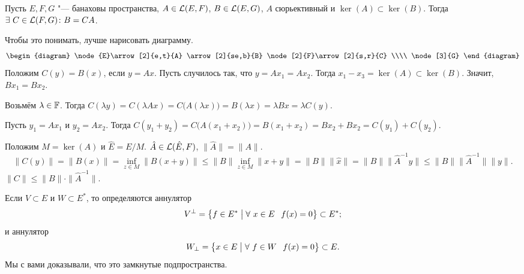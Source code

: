 \begin{The}[о тройке]\label{otroike}
  Пусть $E,F,G$ "--- банаховы пространства, $A\in\mathcal L(E,F)$, $B\in \mathcal L(E,G)$, $A$ сюрьективный и $\ker (A)\subset \ker(B)$. Тогда $\exists\ C\in\mathcal L(F,G)\colon B = CA$.
\end{The}
\begin{Proof}
  Чтобы это понимать, лучше нарисовать диаграмму.
\[
\begin{diagram}
  \node{E}\arrow[2]{e,t}{A}
  	  \arrow[2]{se,b}{B}
  \node[2]{F}\arrow[2]{s,r}{C} \\\\
  \node[3]{G}
\end{diagram}
\]
Положим $C(y) = B(x)$, если $y= Ax$. Пусть случилось так, что $y = Ax_1= A x_2$. Тогда $x_1-x_3 = \ker(A)\subset \ker(B)$. Значит, $B x_1 = B x_2$.

Возьмём $\lambda\in \mathbb F$. Тогда $C(\lambda y) = C(\lambda Ax) = C\big(A(\lambda x)\big) = B(\lambda x) = \lambda Bx = \lambda C(y)$.

Пусть $y_1 = A x_1$ и $y_2 = A x_2$. Тогда $C(y_1+y_2) = C\big( A(x_1+x_2)\big) = B(x_1 +x_2) = Bx_2 + Bx_2 = C(y_1) + C(y_2)$.

Положим $M = \ker(A)$ и $\hat E = E/M$.  $\hat A\in\mathcal L(\hat E,F)$, $\|\hat A\|=\|A\|$.
\[
  \big\|C(y)\big\| = \big\|B(x)\big\| = \inf\limits_{z\in M}\big\|B(x+y)\big\|\le
  \|B\|\inf\limits_{z\in M}\|x+y\| = \|B\| \|\hat x\|=
  \|B\|\|\hat A^{-1}y\|\le \|B\|\|\hat A^{-1}\|\|y\|.
\]
$\|C\|\le \|B\|\cdot \|\hat A^{-1}\|$.
\end{Proof}


Если $V\subset E$ и $W\subset E^*$, то определяются аннулятор 
\[
V^\perp = \big\{f\in E^*\bigm| \forall\ x\in E\hskip .75em plus.1em minus.08em\relax f(x)=0\big\}\subset E^*;
\]
и аннулятор
\[
  W_\perp = \big\{x\in E\bigm| \forall\ f\in W\pau f(x)=0\big\}\subset E.
\]
Мы с вами доказывали, что это замкнутые подпространства.

